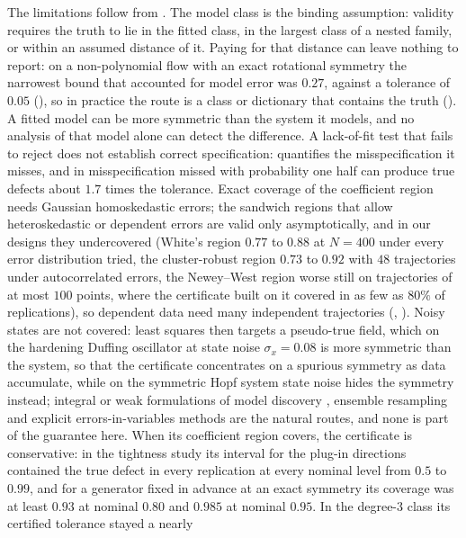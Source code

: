 The limitations follow from . The model class is the
binding assumption: validity requires the truth to lie in the fitted class, in
the largest class of a nested family, or within an assumed distance of it.
Paying for that distance can leave nothing to report: on a non-polynomial flow
with an exact rotational symmetry the narrowest bound that accounted for model
error was $0.27$, against a tolerance of $0.05$ (\SFmodelerror), so in practice the
route is a class or dictionary that contains the truth (\STdictionary). A
fitted model can be more symmetric than the system it models, and no analysis
of that model alone can detect the difference. A lack-of-fit test that fails to
reject does not establish correct specification:  quantifies
the misspecification it misses, and in  misspecification
missed with probability one half can produce true defects about $1.7$ times the
tolerance. Exact coverage of the coefficient region needs Gaussian
homoskedastic errors; the sandwich regions that allow heteroskedastic or
dependent errors are valid only asymptotically, and in our designs they
undercovered (White's region $0.77$ to $0.88$ at $N = 400$ under every error
distribution tried, the cluster-robust region $0.73$ to $0.92$ with $48$
trajectories under autocorrelated errors, the Newey--West region worse still
on trajectories of at most $100$ points, where the certificate built on it
covered in as few as $80\%$ of replications), so dependent data need many
independent trajectories (\SFdependence, \STdependence). Noisy states are not covered: least squares then targets a
pseudo-true field, which on the hardening Duffing oscillator at state noise
$\sigma_x = 0.08$ is more symmetric than the system, so that the certificate concentrates
on a spurious symmetry as data accumulate, while on the symmetric Hopf system
state noise hides the symmetry instead; integral or weak formulations of
model discovery \citep{messenger2021weak}, ensemble resampling
\citep{fasel2022ensemble} and explicit errors-in-variables methods
\citep{carroll2006measurement} are the natural routes, and none is part of the
guarantee here. When its coefficient region covers, the certificate is
conservative: in the tightness study its interval for the plug-in directions
contained the true defect in every replication at every nominal level from
$0.5$ to $0.99$, and for a generator fixed in advance at an exact symmetry its
coverage was at least $0.93$ at nominal
$0.80$ and $0.985$ at nominal $0.95$. In the degree-$3$ class its certified tolerance stayed a nearly
